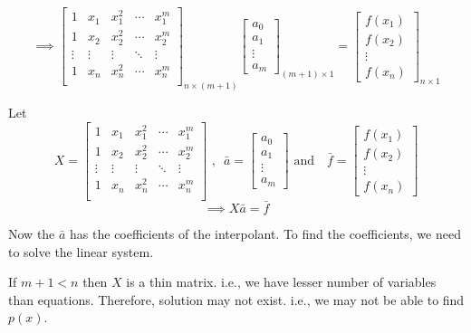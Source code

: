 \documentclass[
]{book}
\begin{document}
\begin{equation}
\implies \begin{bmatrix}
1 & x_1 & x_1^2 & \cdots & x_1^m\\
1 & x_2 & x_2^2 & \cdots & x_2^m\\
\vdots & \vdots & \vdots & \ddots & \vdots \\
1 & x_n & x_n^2 & \cdots & x_n^m\\
\end{bmatrix}_{n \times(m+1)} \begin{bmatrix}a_0\\a_1\\ \vdots \\a_m \end{bmatrix}_{(m+1) \times 1}  = \begin{bmatrix} f(x_1)\\f(x_2)\\ \vdots \\f(x_n) \end{bmatrix}_{n\times 1}
\end{equation}

Let \[X = \begin{bmatrix}
1 & x_1 & x_1^2 & \cdots & x_1^m\\
1 & x_2 & x_2^2 & \cdots & x_2^m\\
\vdots & \vdots & \vdots & \ddots & \vdots \\
1 & x_n & x_n^2 & \cdots & x_n^m\\
\end{bmatrix}\text{ ,} \ \  \ \bar{a} = \begin{bmatrix}a_0\\a_1\\ \vdots \\a_m \end{bmatrix}  \text{ and } \ \ \ \bar{f}=  \begin{bmatrix} f(x_1)\\f(x_2)\\ \vdots \\f(x_n) \end{bmatrix}\]
\[\implies X\bar{a} = \bar{f}\]

Now the \(\bar{a}\) has the coefficients of the interpolant. To find the coefficients, we need to solve the linear system.

If \(m+1<n\) then \(X\) is a thin matrix. i.e., we have lesser number of variables than equations. Therefore, solution may not exist. i.e., we may not be able to find \(p(x)\).
\end{document}
